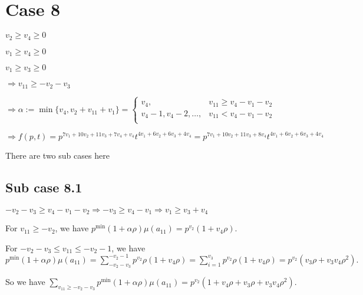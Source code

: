\documentclass{article}
\begin{document}
\section{Case 8}
$v_2\geq{v_4}\geq{0}$

$v_1\geq{v_4}\geq{0}$

$v_1\geq{v_3}\geq{0}$

$\Rightarrow{v_{11}}\geq{-v_2-v_3}$

$\Rightarrow\alpha:=\min\{v_4,v_2+v_{11}+v_1\}=\begin{cases}
       v_4, & v_{11}\geq{v_4-v_1-v_2}\\
       v_4-1,v_4-2,\dots, & v_{11}<{v_4-v_1-v_2}\\
     \end{cases}$

     $\Rightarrow{f(p,t)=p^{7v_1+10v_2+11v_3+7v_4+v_4}t^{4v_1+6v_2+6v_3+4v_4}=p^{7v_1+10v_2+11v_3+8v_4}t^{4v_1+6v_2+6v_3+4v_4}}$

There are two sub cases here

\subsection{Sub case 8.1}

$-v_2-v_3\geq{v_4-v_1-v_2}\Rightarrow{-v_3\geq{v_4-v_1}}\Rightarrow{v_1\geq{v_3+v_4}}$

For $v_{11}\geq{-v_2}$, we have $p^{\min}(1+\alpha\rho)\mu(a_{11})=p^{v_2}(1+v_4\rho).$

For $-v_2-v_3\leq{v_{11}}\leq{-v_2-1}$, we have $p^{\min}(1+\alpha\rho)\mu(a_{11})=\sum_{-v_2-v_3}^{-v_2-1}p^{v_2}\rho(1+v_4\rho)=\sum_{i=1}^{v_3}p^{v_2}\rho(1+v_4\rho)=p^{v_2}(v_3\rho+v_3v_4\rho^2).$

So we have $\sum_{v_{11}\geq{-v_2-v_3}}p^{\min}(1+\alpha\rho)\mu(a_{11})=p^{v_2}(1+v_4\rho+v_3\rho+v_3v_4\rho^2).$
\end{document}
